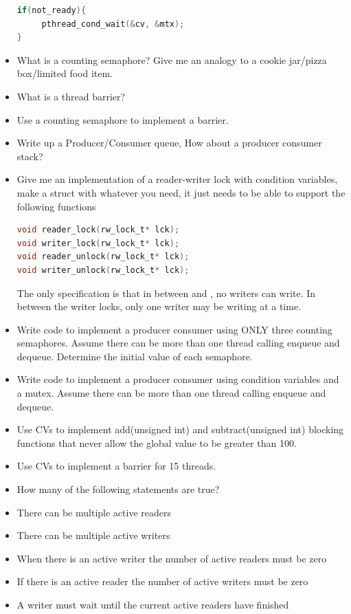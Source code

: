 \begin{itemize}
\begin{lstlisting}[language=C]
if(not_ready){
     pthread_cond_wait(&cv, &mtx);
}
\end{lstlisting}

\item
  What is a counting semaphore? Give me an analogy to a cookie jar/pizza box/limited food item.
\item
  What is a thread barrier?
\item
  Use a counting semaphore to implement a barrier.
\item
  Write up a Producer/Consumer queue, How about a producer consumer stack?
\item
  Give me an implementation of a reader-writer lock with condition variables, make a struct with whatever you need, it just needs to be able to support the following functions

\begin{lstlisting}[language=C]
void reader_lock(rw_lock_t* lck);
void writer_lock(rw_lock_t* lck);
void reader_unlock(rw_lock_t* lck);
void writer_unlock(rw_lock_t* lck);
\end{lstlisting}

  The only specification is that in between  and , no writers can write. In between the writer locks, only one writer may be writing at a time.
\item
  Write code to implement a producer consumer using ONLY three counting semaphores. Assume there can be more than one thread calling enqueue and dequeue. Determine the initial value of each semaphore.
\item
  Write code to implement a producer consumer using condition variables and a mutex. Assume there can be more than one thread calling enqueue and dequeue.
\item
  Use CVs to implement add(unsigned int) and subtract(unsigned int) blocking functions that never allow the global value to be greater than 100.
\item
  Use CVs to implement a barrier for 15 threads.
\item
  How many of the following statements are true?
\item
There can be multiple active readers
\item
There can be multiple active writers
\item
When there is an active writer the number of active readers must be zero
\item
If there is an active reader the number of active writers must be zero
\item
A writer must wait until the current active readers have finished
\end{itemize}



